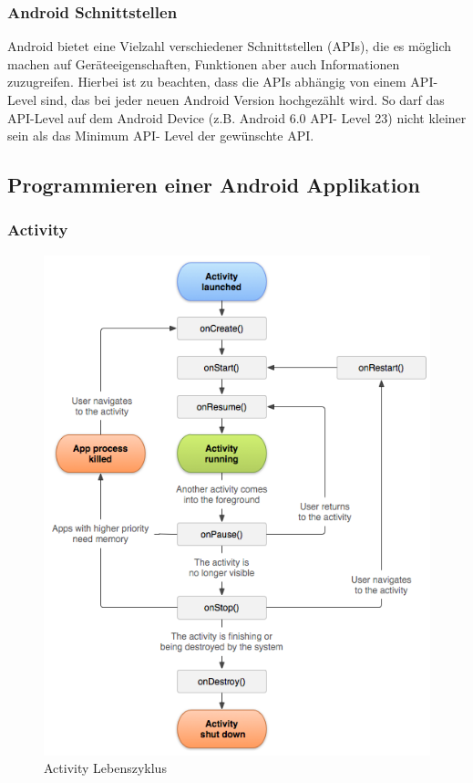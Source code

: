 \documentclass{article}
\begin{document}
{		\subsubsection{Android Schnittstellen}
			Android bietet eine Vielzahl verschiedener Schnittstellen (APIs), die es möglich machen auf Geräteeigenschaften, Funktionen aber auch Informationen zuzugreifen. Hierbei ist zu beachten, dass die APIs abhängig von einem API- Level sind, das bei jeder neuen Android Version hochgezählt wird. So darf das API-Level auf dem Android Device (z.B. Android 6.0 API- Level 23) nicht kleiner sein als das Minimum API- Level der gewünschte API.

	\subsection{Programmieren einer Android Applikation}
		\subsubsection{Activity}

			\begin{figure}
				\includegraphics[scale=0.35]{Bilder/activity_lifecycle.png}
				\centering
				\vspace{0 cm}
				\caption{Activity Lebenszyklus}
				\label{fig1}	
			\end{figure}


}
\end{document}

